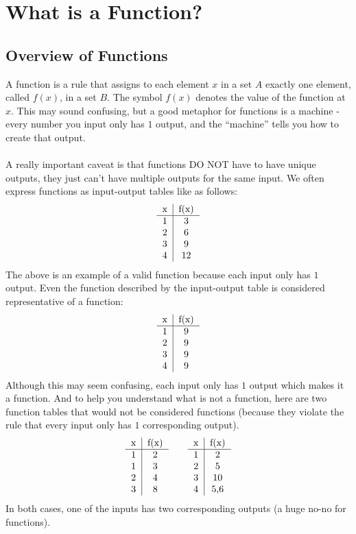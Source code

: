 
\section{What is a Function?}
\subsection{Overview of Functions}
A function is a rule that assigns to each element $x$ in a set $A$ exactly one element, called $f(x)$, in a set $B$. The symbol $f(x)$ denotes the value of the function at $x$. This may sound confusing, but a good metaphor for functions is a machine - every number you input only has $1$ output, and the ``machine'' tells you how to create that output. \\
\\
A really important caveat is that functions DO NOT have to have unique outputs, they just can't have multiple outputs for the same input. We often express functions as input-output tables like as follows:
$$
\begin{tabular}{c|c}
    x & f(x) \\
    \hline
    1 & 3\\
    2 & 6\\
    3 & 9\\
    4 & 12\\
\end{tabular}
$$
The above is an example of a valid function because each input only has $1$ output. Even the function described by the input-output table is considered representative of a function:
$$
\begin{tabular}{c|c}
    x & f(x) \\
    \hline
    1 & 9\\
    2 & 9\\
    3 & 9\\
    4 & 9\\
\end{tabular}
$$
Although this may seem confusing, each input only has $1$ output which makes it a function. And to help you understand what is not a function, here are two function tables that would not be considered functions (because they violate the rule that every input only has $1$ corresponding output).
$$
\begin{tabular}{c|c} 
     x & f(x) \\
     \hline
     1 & 2 \\
     1 & 3 \\
     2 & 4 \\
     3 & 8 \\
\end{tabular} \quad \quad
\begin{tabular}{c|c}
     x & f(x) \\
     \hline
     1 & 2 \\
     2 & 5\\
     3 & 10\\
     4 & 5,6 \\
\end{tabular}
$$
In both cases, one of the inputs has two corresponding outputs (a huge no-no for functions). 

